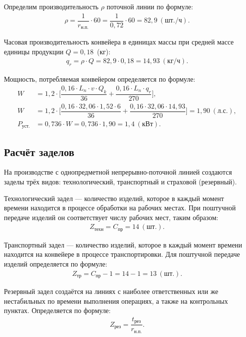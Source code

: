 Определим производительность $\rho$ поточной линии по формуле:
\begin{align*}
  \rho = \dfrac{1}{r_{\text{н.п.}}} \cdot 60 = \dfrac{1}{0{,}72} \cdot 60 = 82{,}9~(\text{шт./ч}).
\end{align*}

Часовая производительность конвейера в единицах массы при средней массе
единицы продукции $Q = 0{,}18 $~(кг):
\begin{align*}
  q_r = \rho \cdot Q = 82{,}9 \cdot 0{,}18 = 14{,}93~(\text{кг/ч}).
\end{align*}

Мощность, потребляемая конвейером определяется по формуле:
\begin{align*}
  W &= 1{,}2 \cdot \Big[ \dfrac{ 0{,}16 \cdot L_n \cdot v \cdot Q_k }{ 36 } + \dfrac{ 0{,}16 \cdot L_n \cdot q_r }{ 270 } \Big] , \\
  W &= 1{,}2 \cdot \Big[ \dfrac{ 0{,}16 \cdot 32{,}06 \cdot 1{,}52 \cdot 6 }{ 36 } + \dfrac{ 0{,}16 \cdot 32{,}06 \cdot 14{,}93 }{ 270 } \Big] = 1{,}90~(\text{л.с.}), \\
  P_{\text{уст.}} &= 0{,}736 \cdot W = 0{,}736 \cdot 1{,}90 = 1{,}4~(\text{кВт}).
\end{align*}


\subsection{Расчёт заделов}

На производстве с однопредметной непрерывно-поточной линией создаются заделы
трёх видов: технологический, транспортный и страховой (резервный).

Технологический задел --- количество изделий, которое в каждый момент времени
находится в процессе обработки на рабочих местах. При поштучной передаче изделий
он соответствует числу рабочих мест, таким образом:
\begin{align*}
  Z_{\text{техн}} = C_{\text{пр}} = 14~(\text{шт.}).
\end{align*}

Транспортный задел --- количество изделий, которое в каждый момент времени
находится на конвейере в процессе транспортировки. Для поштучной передаче
изделий определяется по формуле:
\begin{align*}
  Z_{\text{тр}} = C_{\text{пр}} - 1 = 14 - 1 = 13~(\text{шт.}).
\end{align*}

Резервный задел создаётся на линиях с наиболее ответственных или же нестабильных
по времени выполнения операциях, а также на контрольных пунктах. Определяется
по формуле:
\begin{align*}
  Z_{\text{рез}} = \dfrac{t_{\text{рез}}}{r_{\text{н.п.}}}.
\end{align*}

